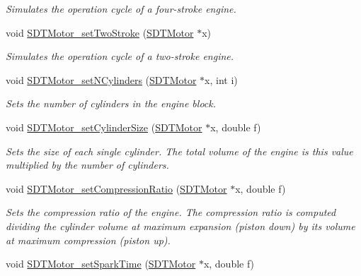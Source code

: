 \begin{DoxyCompactItemize}
\begin{DoxyCompactList}\small\item\em Simulates the operation cycle of a four-\/stroke engine. \end{DoxyCompactList}\item 
\hypertarget{group__motor_ga053e9e113632f147c53de3d5830a6a04}{}void \hyperlink{group__motor_ga053e9e113632f147c53de3d5830a6a04}{S\+D\+T\+Motor\+\_\+set\+Two\+Stroke} (\hyperlink{group__motor_ga71a2e0e68d27c741a163f1b9819acb1b}{S\+D\+T\+Motor} $\ast$x)\label{group__motor_ga053e9e113632f147c53de3d5830a6a04}

\begin{DoxyCompactList}\small\item\em Simulates the operation cycle of a two-\/stroke engine. \end{DoxyCompactList}\item 
void \hyperlink{group__motor_ga6741c59cfd0c2ee14082107c82020ffe}{S\+D\+T\+Motor\+\_\+set\+N\+Cylinders} (\hyperlink{group__motor_ga71a2e0e68d27c741a163f1b9819acb1b}{S\+D\+T\+Motor} $\ast$x, int i)
\begin{DoxyCompactList}\small\item\em Sets the number of cylinders in the engine block. \end{DoxyCompactList}\item 
void \hyperlink{group__motor_ga8f1f2fd7f068222a20149daa1bb9b0f6}{S\+D\+T\+Motor\+\_\+set\+Cylinder\+Size} (\hyperlink{group__motor_ga71a2e0e68d27c741a163f1b9819acb1b}{S\+D\+T\+Motor} $\ast$x, double f)
\begin{DoxyCompactList}\small\item\em Sets the size of each single cylinder. The total volume of the engine is this value multiplied by the number of cylinders. \end{DoxyCompactList}\item 
void \hyperlink{group__motor_gaba51c023320c4b669867c4bff7c09d20}{S\+D\+T\+Motor\+\_\+set\+Compression\+Ratio} (\hyperlink{group__motor_ga71a2e0e68d27c741a163f1b9819acb1b}{S\+D\+T\+Motor} $\ast$x, double f)
\begin{DoxyCompactList}\small\item\em Sets the compression ratio of the engine. The compression ratio is computed dividing the cylinder volume at maximum expansion (piston down) by its volume at maximum compression (piston up). \end{DoxyCompactList}\item 
void \hyperlink{group__motor_ga2a9413739465e0ada9469684fa0d72f2}{S\+D\+T\+Motor\+\_\+set\+Spark\+Time} (\hyperlink{group__motor_ga71a2e0e68d27c741a163f1b9819acb1b}{S\+D\+T\+Motor} $\ast$x, double f)

\end{DoxyCompactItemize}
